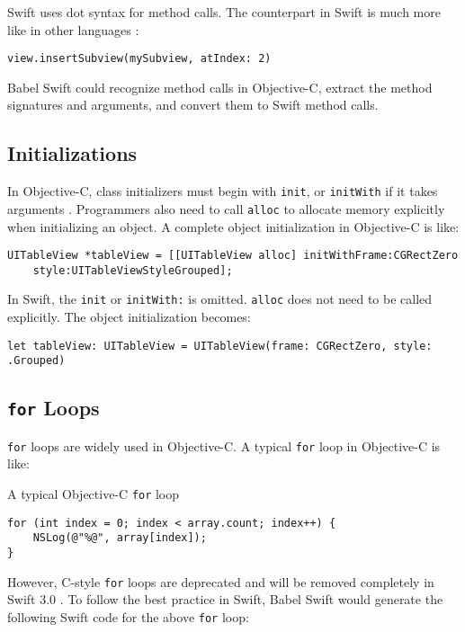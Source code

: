 \documentclass{sfuthesis}
\begin{document}
Swift uses dot syntax for method calls. The counterpart in Swift is much more like in other languages \cite{swiftobjcapis}:

\begin{verbatim}
view.insertSubview(mySubview, atIndex: 2)
\end{verbatim}

Babel Swift could recognize method calls in Objective-C, extract the method signatures and arguments, and convert them to Swift method calls.

\subsection{Initializations}

In Objective-C, class initializers must begin with \texttt{init}, or \texttt{initWith} if it takes arguments \cite{objcinit}. Programmers also need to call \texttt{alloc} to allocate memory explicitly when initializing an object. A complete object initialization in Objective-C is like:

\begin{verbatim}
UITableView *tableView = [[UITableView alloc] initWithFrame:CGRectZero
    style:UITableViewStyleGrouped];
\end{verbatim}

In Swift, the \texttt{init} or \texttt{initWith:} is omitted. \texttt{alloc} does not need to be called explicitly. The object initialization becomes:

\begin{verbatim}
let tableView: UITableView = UITableView(frame: CGRectZero, style: .Grouped)
\end{verbatim}

\subsection{\texttt{for} Loops}

\texttt{for} loops are widely used in Objective-C. A typical \texttt{for} loop in Objective-C is like:

\begin{listing}[H]
\caption{A typical Objective-C \texttt{for} loop}
\label{lst:forloop}
\begin{verbatim}
for (int index = 0; index < array.count; index++) {
    NSLog(@"%@", array[index]);
}
\end{verbatim}
\end{listing}

However, C-style \texttt{for} loops are deprecated and will be removed completely in Swift 3.0 \cite{removecforloops}. To follow the best practice in Swift, Babel Swift would generate the following Swift code for the above \texttt{for} loop:
\end{document}
